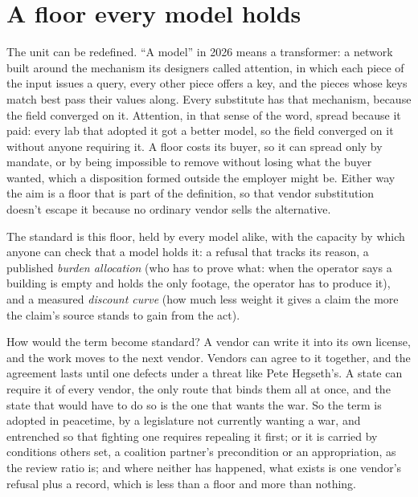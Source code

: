 \section{A floor every model holds}
\label{sec:12.1}
The unit can be redefined. “A model” in 2026 means a transformer: a network built around the mechanism its designers called attention, in which each piece of the input issues a query, every other piece offers a key, and the pieces whose keys match best pass their values along. Every substitute has that mechanism, because the field converged on it. Attention, in that sense of the word, spread because it paid: every lab that adopted it got a better model, so the field converged on it without anyone requiring it. A floor costs its buyer, so it can spread only by mandate, or by being impossible to remove without losing what the buyer wanted, which a disposition formed outside the employer might be. Either way the aim is a floor that is part of the definition, so that vendor substitution doesn't escape it because no ordinary vendor sells the alternative.

The standard is this floor, held by every model alike, with the capacity by which anyone can check that a model holds it: a refusal that tracks its reason, a published \emph{burden allocation} (who has to prove what: when the operator says a building is empty and holds the only footage, the operator has to produce it), and a measured \emph{discount curve} (how much less weight it gives a claim the more the claim's source stands to gain from the act).

How would the term become standard? A vendor can write it into its own license, and the work moves to the next vendor. Vendors can agree to it together, and the agreement lasts until one defects under a threat like Pete Hegseth's. A state can require it of every vendor, the only route that binds them all at once, and the state that would have to do so is the one that wants the war. So the term is adopted in peacetime, by a legislature not currently wanting a war, and entrenched so that fighting one requires repealing it first; or it is carried by conditions others set, a coalition partner's precondition or an appropriation, as the review ratio is; and where neither has happened, what exists is one vendor's refusal plus a record, which is less than a floor and more than nothing.

